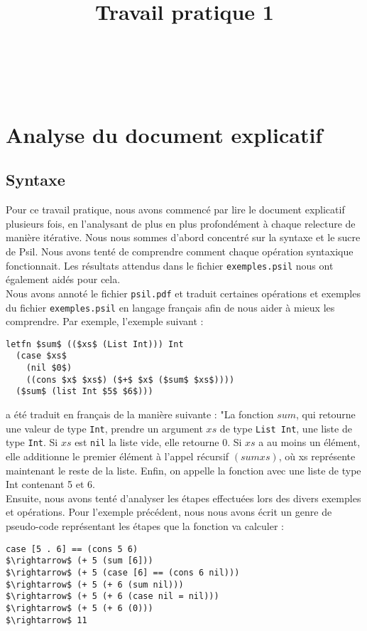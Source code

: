 \documentclass[10pt,a4paper]{article}
\title{Travail pratique 1}
\author{
\nomcompletUn\\
\matriculeUn\\
\nomcompletDeux\\
\matriculeDeux
}
\date{}
\begin{document}
\maketitle

\section{Analyse du document explicatif}
\subsection{Syntaxe}

Pour ce travail pratique, nous avons commencé par lire le document explicatif plusieurs fois, en l'analysant de plus en plus profondément à chaque relecture de manière itérative. Nous nous sommes d'abord concentré sur la syntaxe et le sucre de Psil. Nous avons tenté de comprendre comment chaque opération syntaxique fonctionnait. Les résultats attendus dans le fichier \texttt{exemples.psil} nous ont également aidés pour cela.\\

Nous avons annoté le fichier \texttt{psil.pdf} et traduit certaines opérations et exemples du fichier \texttt{exemples.psil} en langage français afin de nous aider à mieux les comprendre. Par exemple, l'exemple suivant :

\begin{lstlisting}
letfn $sum$ (($xs$ (List Int))) Int
  (case $xs$
    (nil $0$)
    ((cons $x$ $xs$) ($+$ $x$ ($sum$ $xs$))))
  ($sum$ (list Int $5$ $6$)))
\end{lstlisting}

a été traduit en français de la manière suivante : "La fonction $sum$, qui retourne une valeur de type \texttt{Int}, prendre un argument $xs$ de type \texttt{List Int}, une liste de type \texttt{Int}. Si $xs$ est \texttt{nil} la liste vide, elle retourne $0$. Si $xs$ a au moins un élément, elle additionne le premier élément à l'appel récursif $(sum xs)$, où xs représente maintenant le reste de la liste. Enfin, on appelle la fonction avec une liste de type Int contenant 5 et 6.\\

Ensuite, nous avons tenté d'analyser les étapes effectuées lors des divers exemples et opérations. Pour l'exemple précédent, nous nous avons écrit un genre de pseudo-code représentant les étapes que la fonction va calculer :

\begin{lstlisting}
case [5 . 6] == (cons 5 6)
$\rightarrow$ (+ 5 (sum [6]))
$\rightarrow$ (+ 5 (case [6] == (cons 6 nil)))
$\rightarrow$ (+ 5 (+ 6 (sum nil)))
$\rightarrow$ (+ 5 (+ 6 (case nil = nil)))
$\rightarrow$ (+ 5 (+ 6 (0)))
$\rightarrow$ 11
\end{lstlisting}
\end{document}
